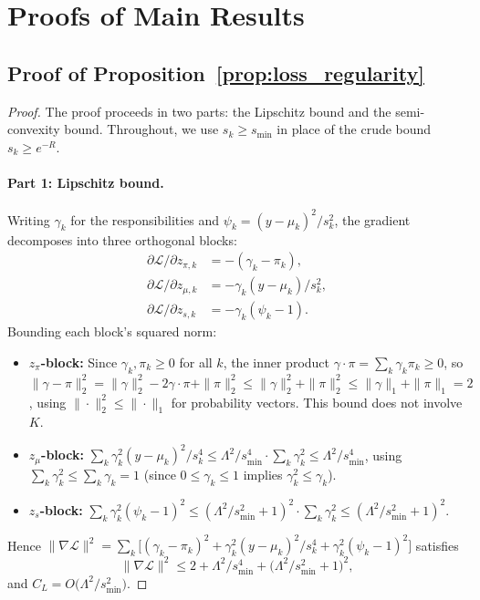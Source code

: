 \documentclass[11pt]{article}
\newcommand{\cL}{\mathcal{L}}
\begin{document}
\section{Proofs of Main Results}\label{app:proofs}

\subsection{Proof of Proposition~\ref{prop:loss_regularity}}\label{sec:proof_loss_regularity}

\begin{proof}
The proof proceeds in two parts: the Lipschitz bound and the
semi-convexity bound. Throughout, we use $s_k \ge s_{\min}$ in place of the
crude bound $s_k \ge e^{-R}$.

\paragraph{Part 1: Lipschitz bound.}
Writing $\gamma_k$ for the responsibilities and
$\psi_k = (y-\mu_k)^2/s_k^2$, the gradient decomposes into three
orthogonal blocks:
\begin{align*}
  \partial\cL/\partial z_{\pi,k} &= -(\gamma_k - \pi_k), \\
  \partial\cL/\partial z_{\mu,k} &= -\gamma_k (y-\mu_k)/s_k^2, \\
  \partial\cL/\partial z_{s,k}   &= -\gamma_k(\psi_k - 1).
\end{align*}
Bounding each block's squared norm:
\begin{itemize}
  \item \textbf{$z_\pi$-block:}
    Since $\gamma_k, \pi_k \ge 0$ for all $k$, the inner product
    $\gamma \cdot \pi = \sum_k \gamma_k \pi_k \ge 0$, so
    $\|\gamma - \pi\|_2^2 = \|\gamma\|_2^2 - 2\gamma\cdot\pi + \|\pi\|_2^2
    \le \|\gamma\|_2^2 + \|\pi\|_2^2 \le \|\gamma\|_1 + \|\pi\|_1 = 2$,
    using $\|\cdot\|_2^2 \le \|\cdot\|_1$ for probability vectors.
    This bound does not involve $K$.
  \item \textbf{$z_\mu$-block:}
    $\textstyle\sum_k \gamma_k^2 (y-\mu_k)^2/s_k^4
    \le \Lambda^2/s_{\min}^4\cdot\textstyle\sum_k \gamma_k^2
    \le \Lambda^2/s_{\min}^4$,
    using $\sum_k \gamma_k^2 \le \sum_k \gamma_k = 1$
    (since $0 \le \gamma_k \le 1$ implies $\gamma_k^2 \le \gamma_k$).
  \item \textbf{$z_s$-block:}
    $\textstyle\sum_k \gamma_k^2(\psi_k-1)^2
    \le (\Lambda^2/s_{\min}^2+1)^2\cdot\textstyle\sum_k\gamma_k^2
    \le (\Lambda^2/s_{\min}^2+1)^2$.
\end{itemize}
Hence $\|\nabla\cL\|^2 = \sum_{k}\bigl[(\gamma_k-\pi_k)^2
+ \gamma_k^2(y-\mu_k)^2/s_k^4
+ \gamma_k^2(\psi_k-1)^2\bigr]$ satisfies
\begin{equation}\label{eq:grad_sq_bound}
  \|\nabla \cL\|^2
  \le 2 + \Lambda^2/s_{\min}^4
  + \bigl(\Lambda^2/s_{\min}^2 + 1\bigr)^2,
\end{equation}
and $C_L = O\!\bigl(\Lambda^2/s_{\min}^2\bigr)$.


\end{proof}
\end{document}

